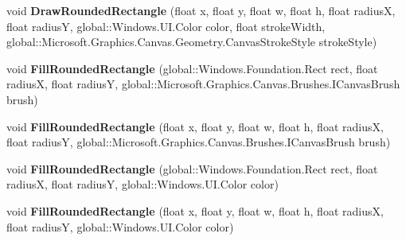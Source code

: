 \begin{DoxyCompactItemize}
\item 
\mbox{\label{class_microsoft_1_1_graphics_1_1_canvas_1_1_canvas_drawing_session_a39d62df59ebc6f0be49bc088c5acbe6a}} 
void {\bfseries Draw\+Rounded\+Rectangle} (float x, float y, float w, float h, float radiusX, float radiusY, global\+::\+Windows.\+U\+I.\+Color color, float stroke\+Width, global\+::\+Microsoft.\+Graphics.\+Canvas.\+Geometry.\+Canvas\+Stroke\+Style stroke\+Style)
\item 
\mbox{\label{class_microsoft_1_1_graphics_1_1_canvas_1_1_canvas_drawing_session_a92115abad0ee220948573a5bfac164af}} 
void {\bfseries Fill\+Rounded\+Rectangle} (global\+::\+Windows.\+Foundation.\+Rect rect, float radiusX, float radiusY, global\+::\+Microsoft.\+Graphics.\+Canvas.\+Brushes.\+I\+Canvas\+Brush brush)
\item 
\mbox{\label{class_microsoft_1_1_graphics_1_1_canvas_1_1_canvas_drawing_session_a0db169715ac5ba1e5005a265cca78a17}} 
void {\bfseries Fill\+Rounded\+Rectangle} (float x, float y, float w, float h, float radiusX, float radiusY, global\+::\+Microsoft.\+Graphics.\+Canvas.\+Brushes.\+I\+Canvas\+Brush brush)
\item 
\mbox{\label{class_microsoft_1_1_graphics_1_1_canvas_1_1_canvas_drawing_session_a1c3e76cfb27814bd529cd24605b7c6e1}} 
void {\bfseries Fill\+Rounded\+Rectangle} (global\+::\+Windows.\+Foundation.\+Rect rect, float radiusX, float radiusY, global\+::\+Windows.\+U\+I.\+Color color)
\item 
\mbox{\label{class_microsoft_1_1_graphics_1_1_canvas_1_1_canvas_drawing_session_a41c62f5f89f33e35b17d75b45871c5c8}} 
void {\bfseries Fill\+Rounded\+Rectangle} (float x, float y, float w, float h, float radiusX, float radiusY, global\+::\+Windows.\+U\+I.\+Color color)
\item 
\mbox{\label{class_microsoft_1_1_graphics_1_1_canvas_1_1_canvas_drawing_session_af313d4d667b4a1512ff9a25e74f321f7}} 

\end{DoxyCompactItemize}
